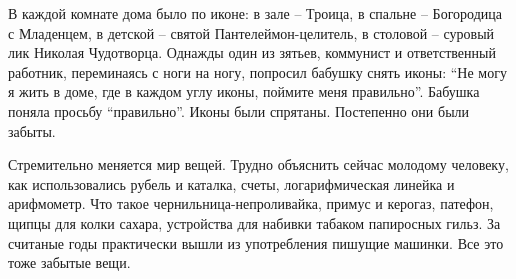 В каждой комнате дома было по иконе: в зале – Троица, в спальне – Богородица с
Младенцем, в детской – святой Пантелеймон-целитель, в столовой – суровый лик
Николая Чудотворца. Однажды один из зятьев, коммунист и ответственный работник,
переминаясь с ноги на ногу, попросил бабушку снять иконы: \enquote{Не могу я жить в
доме, где в каждом углу иконы, поймите меня правильно}. Бабушка поняла просьбу
\enquote{правильно}. Иконы были спрятаны. Постепенно они были забыты.

Стремительно меняется мир вещей. Трудно объяснить сейчас молодому человеку, как
использовались рубель и каталка, счеты, логарифмическая линейка и арифмометр.
Что такое чернильница-непроливайка, примус и керогаз, патефон, щипцы для колки
сахара, устройства для набивки табаком папиросных гильз. За считаные годы
практически вышли из употребления пишущие машинки. Все это тоже забытые вещи.

